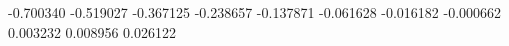 -0.700340
-0.519027
-0.367125
-0.238657
-0.137871
-0.061628
-0.016182
-0.000662
0.003232
0.008956
0.026122
